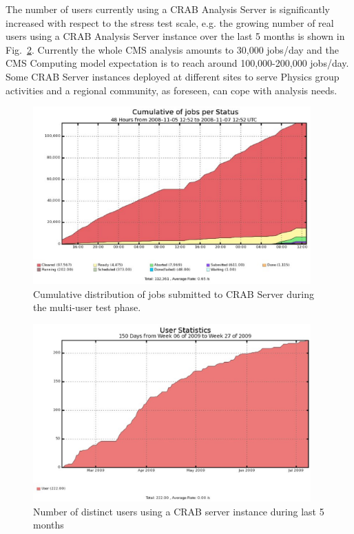 The number of users currently using a CRAB Analysis Server is significantly 
increased with respect to the stress test scale, e.g. the growing number of real users using a CRAB Analysis Server instance over the last 5 months is shown in Fig.~\ref{fig:CSusers}.
Currently the whole CMS analysis amounts to 30,000 jobs/day and the
CMS Computing model expectation is to reach around 100,000-200,000 jobs/day. 
Some CRAB Server instances deployed at different sites to serve Physics
group activities and a regional community, as foreseen, can cope with
analysis needs.
\begin{figure}
\centering
\includegraphics[width=0.95\textwidth]{MultiUserJobStatus.eps}
\caption{Cumulative distribution of jobs submitted to CRAB Server
  during the multi-user test phase. }
\label{fig:stressmulti}
\end{figure}
\begin{figure}
\centering
\includegraphics[width=0.95\textwidth]{CSusersLast5months.eps}
\caption{Number of distinct users using a CRAB server instance during last 5 months}
\label{fig:CSusers}
\end{figure}



